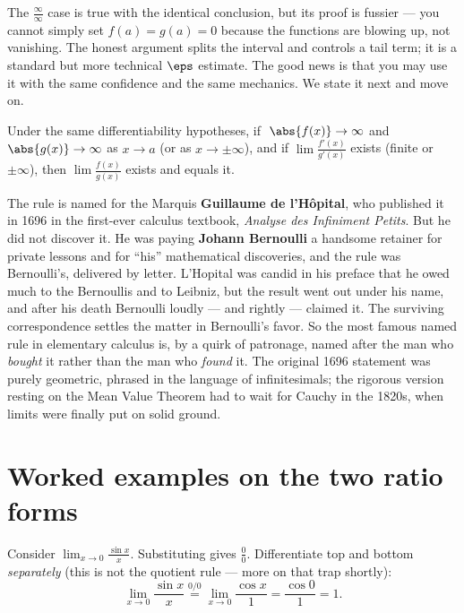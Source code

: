 \begin{remark}
The $\tfrac{\infty}{\infty}$ case is true with the identical conclusion, but its proof
is fussier --- you cannot simply set $f(a)=g(a)=0$ because the functions are blowing
up, not vanishing. The honest argument splits the interval and controls a tail term;
it is a standard but more technical $\eps$ estimate. The good news is that you may use
it with the same confidence and the same mechanics. We state it next and move on.
\end{remark}

\begin{theorem}\label{ch18:thm-lhopital-inf}
Under the same differentiability hypotheses, if $\;\abs{f(x)}\to\infty$ and
$\abs{g(x)}\to\infty$ as $x\to a$ (or as $x\to\pm\infty$), and if
$\lim \tfrac{f'(x)}{g'(x)}$ exists (finite or $\pm\infty$), then
$\lim \tfrac{f(x)}{g(x)}$ exists and equals it.
\end{theorem}

\begin{historybox}
The rule is named for the Marquis \textbf{Guillaume de l'H\^opital}, who published it
in 1696 in the first-ever calculus textbook, \emph{Analyse des Infiniment Petits}. But
he did not discover it. He was paying \textbf{Johann Bernoulli} a handsome retainer for
private lessons and for ``his'' mathematical discoveries, and the rule was Bernoulli's,
delivered by letter. L'Hopital was candid in his preface that he owed much to the
Bernoullis and to Leibniz, but the result went out under his name, and after his death
Bernoulli loudly --- and rightly --- claimed it. The surviving correspondence settles
the matter in Bernoulli's favor. So the most famous named rule in elementary calculus
is, by a quirk of patronage, named after the man who \emph{bought} it rather than the
man who \emph{found} it. The original 1696 statement was purely geometric, phrased in
the language of infinitesimals; the rigorous version resting on the Mean Value Theorem
had to wait for Cauchy in the 1820s, when limits were finally put on solid ground.
\end{historybox}

\section{Worked examples on the two ratio forms}

\begin{example}\label{ch18:ex-sinx}
Consider $\displaystyle\lim_{x\to 0}\frac{\sin x}{x}$. Substituting gives
$\tfrac{0}{0}$. Differentiate top and bottom \emph{separately} (this is not the
quotient rule --- more on that trap shortly):
\[
\lim_{x\to 0}\frac{\sin x}{x}\overset{0/0}{=}\lim_{x\to 0}\frac{\cos x}{1}
=\frac{\cos 0}{1}=1.
\]
\end{example}

